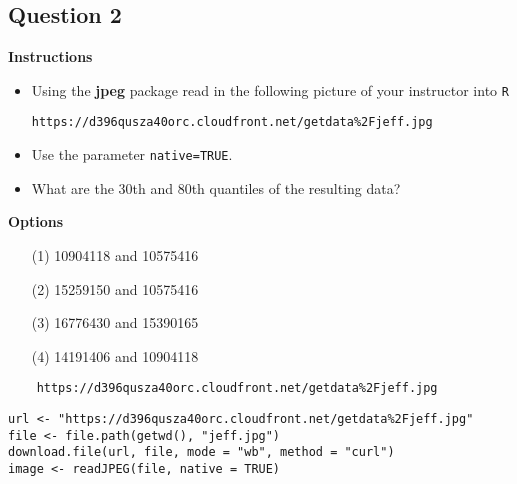 \documentclass[]{article}
\begin{document}
\subsection*{Question 2}
\textbf{Instructions}
\begin{itemize}
\item Using the \textbf{jpeg} package read in the following picture of your instructor into \texttt{R} 

\begin{verbatim}
https://d396qusza40orc.cloudfront.net/getdata%2Fjeff.jpg 
\end{verbatim}

\item Use the parameter \texttt{native=TRUE}. 
\item What are the 30th and 80th quantiles of the resulting data? 

\end{itemize}

\bigskip
\textbf{Options}
\begin{itemize}
\item[(1)] 10904118 and 10575416
\item[(2)] 15259150 and 10575416
\item[(3)] 16776430 and 15390165
\item[(4)] 14191406 and 10904118
\end{itemize}


\begin{framed}
	\begin{verbatim}
	https://d396qusza40orc.cloudfront.net/getdata%2Fjeff.jpg
	\end{verbatim}
\end{framed}


\begin{framed}
\begin{verbatim}
url <- "https://d396qusza40orc.cloudfront.net/getdata%2Fjeff.jpg"
file <- file.path(getwd(), "jeff.jpg")
download.file(url, file, mode = "wb", method = "curl")
image <- readJPEG(file, native = TRUE)
\end{verbatim}
\end{framed}
\newpage
\end{document}
